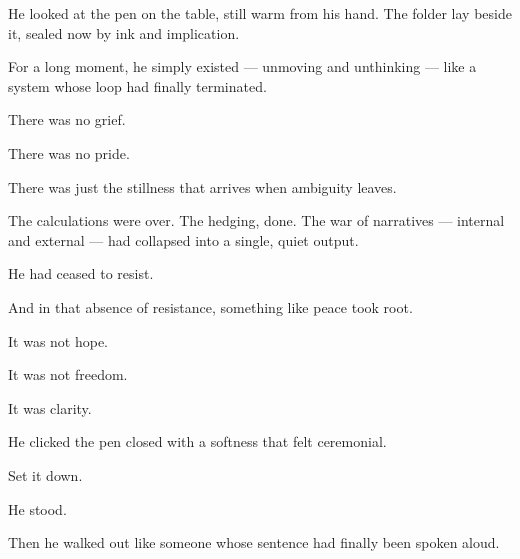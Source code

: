 He looked at the pen on the table, still warm from his hand.
The folder lay beside it, sealed now by ink and implication.

For a long moment, he simply existed --- unmoving and unthinking --- like a system whose loop had 
finally terminated.

There was no grief.

There was no pride.

There was just the stillness that arrives when ambiguity leaves.

The calculations were over.
The hedging, done.
The war of narratives --- internal and external --- had collapsed into a single, quiet output.

He had ceased to resist.

And in that absence of resistance, something like peace took root.

It was not hope. 

It was not freedom.

It was clarity.

He clicked the pen closed with a softness that felt ceremonial.

Set it down.

He stood.

Then he walked out like someone whose sentence had finally been spoken aloud.

